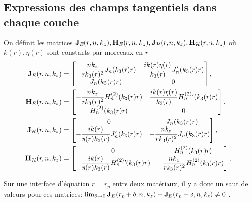   \subsection{Expressions des champs tangentiels dans chaque couche}


    \begin{defn}
      \label{def:cylindre:JE-JH-HE-HH}
      On définit les matrices \(\mathbf{J}_{E}(r,n,k_z),\mathbf{H}_{E}(r,n,k_z),\mathbf{J}_{\mathcal{H}}(r,n,k_z),\mathbf{H}_{\mathcal{H}}(r,n,k_z)\) où \(k(r),\eta(r)\) sont constants par morceaux en \(r\)
      \begin{align*}
        \mathbf{J}_{E}(r,n,k_z) &=
        \begin{bmatrix}
          -\dfrac{nk_z}{rk_3(r)^2}J_n(k_3(r)r) & \dfrac{ik(r)\eta(r)}{k_3(r)}J_n'(k_3(r)r)
          \\
          J_n(k_3(r)r) & 0
        \end{bmatrix},
        \\
        \mathbf{H}_{E}(r,n,k_z) &=
        \begin{bmatrix}
          -\dfrac{nk_z}{rk_3(r)^2}H_n^{(2)}(k_3(r)r) & \dfrac{ik(r)\eta(r)}{k_3(r)}H_n^{(2)}{}'(k_3(r)r)
          \\
          H_n^{(2)}(k_3(r)r) & 0
        \end{bmatrix},
        \\
        \mathbf{J}_{\mathcal{H}}(r,n,k_z) &=
        \begin{bmatrix}
          0 & -J_n(k_3(r)r)
          \\
          -\dfrac{ik(r)}{\eta(r)k_3(r)}J_n'(k_3(r)r) & -\dfrac{nk_z}{rk_3(r)^2}J_n(k_3(r)r)
        \end{bmatrix},
        \\
        \mathbf{H}_{\mathcal{H}}(r,n,k_z) &=
        \begin{bmatrix}
          0 & -H_n^{(2)}(k_3(r)r)
          \\
          -\dfrac{ik(r)}{\eta(r)k_3(r)}H_n^{(2)}{}'(k_3(r)r) & -\dfrac{nk_z}{rk_3(r)^2}H_n^{(2)}(k_3(r)r)
        \end{bmatrix}.
      \end{align*}
    \end{defn}

    Sur une interface d'équation \(r=r_p\) entre deux matériaux, il y a donc un saut de valeurs pour ces matrices: \(\lim_{\delta\rightarrow 0 } \mathbf{J}_E(r_p+ \delta,n,k_z) - \mathbf{J}_E(r_p - \delta,n,k_z) \not = 0\) .

